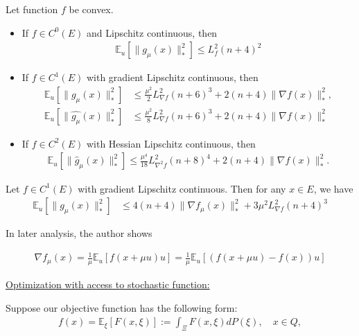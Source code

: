 \documentclass{article}
\begin{document}
\begin{theorem}
Let function $f$ be convex. 

\begin{itemize}
    \item If $f \in C^0(E)$ and Lipschitz continuous, then 
    \begin{align}
        \mathbb{E}_u[\|g_{\mu}(x)\|_*^2] \leq L_f^2(n+4)^2
    \end{align}
    \item If $f \in C^1(E)$ with gradient Lipschitz continuous, then 
    \begin{align}
        \mathbb{E}_u[\|g_{\mu}(x)\|_*^2] & \leq \frac{\mu^2}{2}L_{\nabla f}^2(n+6)^3 + 2(n+4)\|\nabla f(x)\|_*^2, \\ \mathbb{E}_u[\|\hat{g_{\mu}}(x)\|_*^2] & \leq \frac{\mu^2}{8}L_{\nabla f}^2(n+6)^3 + 2(n+4)\|\nabla f(x)\|_*^2 
    \end{align}
    \item If $f \in C^2(E)$ with Hessian Lipschitz continuous, then 
    \begin{align}
        \mathbb{E}_u[\|\hat{g}_{\mu}(x)\|_*^2] \leq \frac{\mu^4}{18}L_{\nabla^2 f}^2(n+8)^4 + 2(n+4)\|\nabla f(x)\|_*^2.
    \end{align}
\end{itemize}
\end{theorem}

\begin{lemma}
Let $f \in C^1(E)$ with gradient Lipschitz continuous. Then for any $x \in E$, we have 
\begin{align}
    \mathbb{E}_u[\|g_{\mu}(x)\|_*^2] & \leq 4(n+4)\|\nabla f_{\mu}(x)\|_*^2 + 3\mu^2L_{\nabla f}^2(n+4)^3
\end{align}
\end{lemma}

In later analysis, the author shows

\begin{theorem}
\begin{align}
    \nabla f_{\mu}(x) = \frac{1}{\mu}\mathbb{E}_u[f(x+\mu u)u] = \frac{1}{\mu}\mathbb{E}_u[(f(x+\mu u)-f(x))u]
\end{align} \end{theorem}

\underline{Optimization with access to stochastic function:} \newline 

Suppose our objective function has the following form:
\begin{align}
    f(x) = \mathbb{E}_{\xi}[F(x,\xi)]:= \int_{\Xi}F(x,\xi)dP(\xi), \quad x \in Q,
\end{align}
\end{document}
